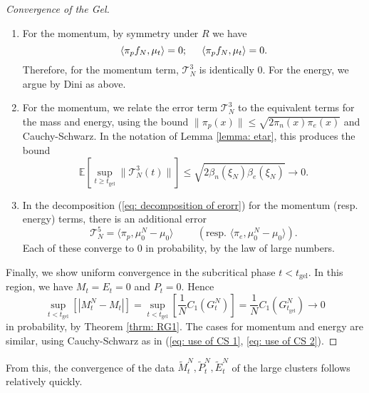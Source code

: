 \begin{proof}[Convergence of the Gel]
\begin{enumerate}[label=\roman{*}).]
       \item For the momentum, by symmetry under $R$ we have \begin{equation}
           \langle \pi_p f_N, \mu_t\rangle =0; \hspace{0.5cm} \langle \pi_p f_N, \mu_t\rangle =0.
       \end{equation} Therefore, for the momentum term, $\mathcal{T}^3_N$ is identically $0$. For the energy, we argue by Dini as above.
       \item For the momentum, we relate the error term $\mathcal{T}^3_N$ to the equivalent terms for the mass and energy, using the bound $\|\pi_p(x)\|\le\sqrt{2\pi_n(x)\pi_e(x)}$ and Cauchy-Schwarz. In the notation of Lemma \ref{lemma: etar}, this produces the bound \begin{equation}
           \mathbb{E}\left[\sup_{t\geq t_\text{gel}} \|\mathcal{T}^3_N(t)\|\right] \leq \sqrt{2 \beta_n(\xi_N)\beta_e(\xi_N)} \rightarrow 0.
       \end{equation}
       \item In the decomposition (\ref{eq: decomposition of erorr}) for the momentum (resp. energy) terms, there is an additional error \begin{equation}
           \mathcal{T}^5_N = \langle \pi_p, \mu^N_0-\mu_0\rangle \hspace{1cm}\left(\text{resp. } \langle \pi_e, \mu^N_0-\mu_0\rangle\right).
       \end{equation} Each of these converge to $0$ in probability, by the law of large numbers.
   \end{enumerate} \bigskip  Finally, we show uniform convergence in the subcritical phase $t<t_\text{gel}$. In this region, we have $M_t=E_t=0$ and $P_t=0$. Hence \begin{equation}
       \sup_{t<t_\text{gel}} \left[|M^N_t-M_t|\right] = \sup_{t<t_\text{gel}}\left[ \frac{1}{N}C_1(G^N_t)\right]=\frac{1}{N}C_1(G^N_{t_\text{gel}}) \rightarrow 0
   \end{equation} in probability, by Theorem \ref{thrm: RG1}. The cases for momentum and energy are similar, using Cauchy-Schwarz as in (\ref{eq: use of CS 1}, \ref{eq: use of CS 2}). \end{proof} 
   
   From this, the convergence of the data $\widetilde{M}^N_t, \widetilde{P}^N_t, \widetilde{E}^N_t$ of the large clusters follows relatively quickly.
   
